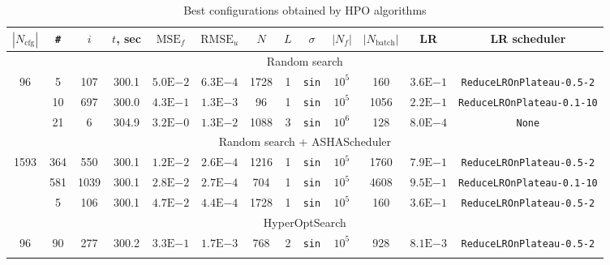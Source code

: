 \documentclass[reprint,
superscriptaddress,
amsmath,amssymb,aps,showkeys,showpacs,
twoside,final,secnumarabic,%
nofootinbib]{revtex4-2}
\begin{document}
\begin{table}
\renewcommand{\arraystretch}{1.25}
\renewcommand{\tabcolsep}{3pt}
\caption{Best configurations obtained by HPO algorithms}
\label{HPO_comparison_table}
\begin{tabular}{|*{13}{c|}}\hline
$|N_\mathrm{cfg}|$ & \verb|#| & $i$ & $t$, sec & $\mathrm{MSE}_f$ & $\mathrm{RMSE}_u$ & $N$ & $L$ & $\sigma$ & $|N_f|$ & $|N_\mathrm{batch}|$ & LR & LR scheduler \\ \hline

\multicolumn{13}{|c|}{Random search} \\ \hline

\multirow{3}{*}{96} & 5 & 107 & 300.1 & $5.0\mathrm{E}{-2}$ & $6.3\mathrm{E}{-4}$ & 1728 & 1 & \texttt{sin} & $10^5$ & 160 & $3.6\mathrm{E}{-1}$ & \texttt{ReduceLROnPlateau-0.5-2} \\ \cline{2-13}

& 10 & 697 & 300.0 & $4.3\mathrm{E}{-1}$ & $1.3\mathrm{E}{-3}$ & 96 & 1 & \texttt{sin} & $10^5$ & 1056 & $2.2\mathrm{E}{-1}$ & \texttt{ReduceLROnPlateau-0.1-10} \\ \cline{2-13}

& 21 & 6 & 304.9 & $3.2\mathrm{E}{-0}$ & $1.3\mathrm{E}{-2}$ & 1088 & 3 & \texttt{sin} & $10^6$ & 128 & $8.0\mathrm{E}{-4}$ & \texttt{None} \\ \hline

\multicolumn{13}{|c|}{Random search + ASHAScheduler} \\ \hline

\multirow{3}{*}{1593} & 364 & 550 & 300.1 & $1.2\mathrm{E}{-2}$ & $2.6\mathrm{E}{-4}$ & 1216 & 1 & \texttt{sin} & $10^5$ & 1760 & $7.9\mathrm{E}{-1}$ & \texttt{ReduceLROnPlateau-0.5-2} \\ \cline{2-13}

& 581 & 1039 & 300.1 & $2.8\mathrm{E}{-2}$ & $2.7\mathrm{E}{-4}$ & 704 & 1 & \texttt{sin} & $10^5$ & 4608 & $9.5\mathrm{E}{-1}$ & \texttt{ReduceLROnPlateau-0.1-10} \\ \cline{2-13}

& 5 & 106 & 300.1 & $4.7\mathrm{E}{-2}$ & $4.4\mathrm{E}{-4}$ & 1728 & 1 & \texttt{sin} & $10^5$ & 160 & $3.6\mathrm{E}{-1}$ & \texttt{ReduceLROnPlateau-0.5-2} \\ \hline

\multicolumn{13}{|c|}{HyperOptSearch} \\ \hline

\multirow{3}{*}{96} & 90 & 277 & 300.2 & $3.3\mathrm{E}{-1}$ & $1.7\mathrm{E}{-3}$ & 768 & 2 & \texttt{sin} & $10^5$ & 928 & $8.1\mathrm{E}{-3}$ & \texttt{ReduceLROnPlateau-0.5-2} \\ \cline{2-13}


\end{tabular}
\end{table}
\end{document}

